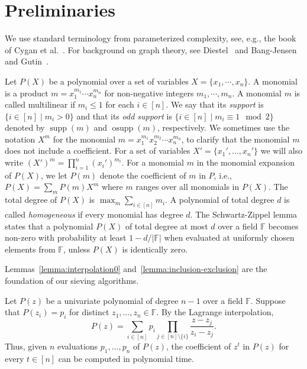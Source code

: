\documentclass{theoretics}
\newcommand{\F}{\ensuremath{\mathbb F}\xspace}
\DeclareMathOperator{\supp}{supp}
\DeclareMathOperator{\osupp}{osupp}
\begin{document}
\section{Preliminaries}
\label{sec:prel}

We use standard terminology from parameterized complexity, see, e.g.,
the book of Cygan et al.~\cite{CyganFKLMPPS15PCbook}.
For background on graph theory, see Diestel~\cite{DiestelBook} and Bang-Jensen and Gutin~\cite{book-digraphs}.

Let $P(X)$ be a polynomial over a set of variables $X = \{ x_1, \cdots, x_n \}$.
A monomial is a product $m = x_1^{m_1} \cdots x_n^{m_n}$ for non-negative integers $m_1, \cdots, m_n$.
A monomial $m$ is called multilinear if $m_i \le 1$ for each $i \in [n]$.
We say that its \emph{support} is $\{ i \in [n] \mid m_i
> 0 \}$ and that its \emph{odd support} is $\{ i \in [n] \mid m_i \equiv 1 \mod 2 \}$ denoted by $\supp(m)$ and $\osupp(m)$, respectively. 
We sometimes use the notation $X^m$ for the monomial $m=x_1^{m_1} x_2^{m_2} \cdots x_n^{m_n}$,
to clarify that the monomial $m$ does not include a coefficient.
For a set of variables $X'=\{x_1',\ldots,x_n'\}$ we will also
write $(X')^m=\prod_{i=1}^n (x_i')^{m_i}$.
For a monomial $m$ in the monomial expansion of $P(X)$, we let $P(m)$ 
denote the coefficient of $m$ in $P$, i.e., $P(X)=\sum_m P(m) X^m$
where $m$ ranges over all monomials in $P(X)$.
The total degree of $P(X)$ is $\max_{m} \sum_{i \in [n]} m_i$.
A polynomial of total degree $d$ is called \emph{homogeneous} if every monomial has degree $d$.
The Schwartz-Zippel lemma \cite{Schwartz80,Zippel79} states that a polynomial $P(X)$ of total degree at most $d$ over a field $\F$ becomes non-zero with probability at least $1 - d / |\F|$ when evaluated at uniformly chosen elements from $\F$, unless $P(X)$ is identically zero.

Lemmas~\ref{lemma:interpolation0} and~\ref{lemma:inclusion-exclusion} are the foundation of our sieving algorithms.

\begin{lemma}[Interpolation]
  \label{lemma:interpolation0}
  Let $P(z)$ be a univariate polynomial of degree $n - 1$ over a field $\F$.
  Suppose that $P(z_i) = p_i$ for distinct $z_1, \dots, z_n \in \F$.
  By the Lagrange interpolation, 
  \[
    P(z)
    = \sum_{i \in [n]} p_i \prod_{j \in [n] \setminus \{ i \}} \frac{z - z_j}{z_i - z_j}.
  \]
  Thus, given $n$ evaluations $p_1, \dots, p_n$ of $P(z)$, the coefficient of $z^t$ in $P(z)$ for every $t \in [n]$ can be computed in polynomial time.
\end{lemma}
\end{document}
